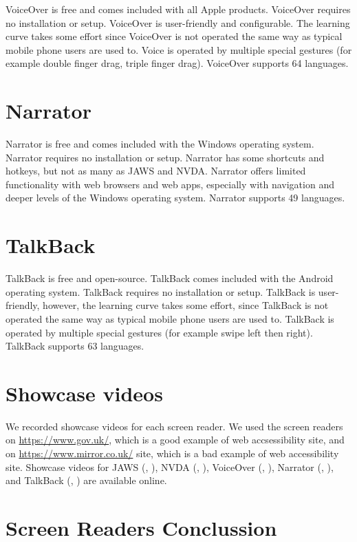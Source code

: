 VoiceOver is free and comes included with all Apple products. VoiceOver requires no installation or setup. VoiceOver is user-friendly and configurable. The learning curve takes some effort since VoiceOver is not operated the same way as typical mobile phone users are used to. Voice is operated by multiple special gestures (for example double finger drag, triple finger drag). VoiceOver supports 64 languages.

\section{Narrator}

Narrator is free and comes included with the Windows operating system. Narrator requires no installation or setup. Narrator has some shortcuts and hotkeys, but not as many as JAWS and NVDA. Narrator offers limited functionality with web  browsers and web apps, especially with navigation and deeper levels of the Windows operating system. Narrator supports 49 languages.

\section{TalkBack}

TalkBack is free and open-source. TalkBack comes included with the Android operating system. TalkBack requires no installation or setup. TalkBack is user-friendly, however, the learning curve takes some effort, since TalkBack is not operated the same way as typical mobile phone users are used to. TalkBack is operated by multiple special gestures (for example swipe left then right). TalkBack supports 63 languages.

\section{Showcase videos}
We recorded showcase videos for each screen reader. We used the screen readers on \url{https://www.gov.uk/}, which is a good example of web accsessibility site, and on \url{https://www.mirror.co.uk/} site, which is a bad example of web accessibility site.
Showcase videos for JAWS (\parencite{JAWS_gov}, \parencite{JAWS_mirror}), NVDA (\parencite{NVDA_gov}, \parencite{NVDA_mirror}), VoiceOver (\parencite{VoiceOver_gov}, \parencite{VoiceOver_mirror}), Narrator (\parencite{Narrator_gov}, \parencite{Narrator_mirror}), and TalkBack (\parencite{TalkBack_gov}, \parencite{TalkBack_mirror}) are available online.

\section{Screen Readers Conclussion}

